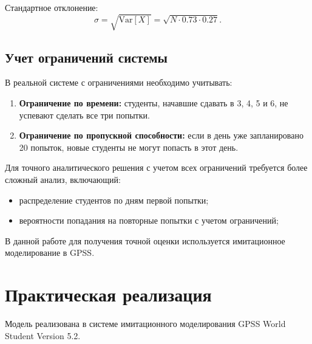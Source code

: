 \documentclass[a4paper, 14pt]{extarticle}
\begin{document}
Стандартное отклонение:
\[
\sigma = \sqrt{\text{Var}[X]} = \sqrt{N \cdot 0.73 \cdot 0.27}.
\]

\subsection{Учет ограничений системы}
В реальной системе с ограничениями необходимо учитывать:
\begin{enumerate}
  \item \textbf{Ограничение по времени:} студенты, начавшие сдавать в 3, 4, 5 и 6, не успевают сделать все три попытки.
  \item \textbf{Ограничение по пропускной способности:} если в день уже запланировано 20 попыток, новые студенты не могут попасть в этот день.
\end{enumerate}

Для точного аналитического решения с учетом всех ограничений требуется более сложный анализ, включающий:
\begin{itemize}
  \item распределение студентов по дням первой попытки;
  \item вероятности попадания на повторные попытки с учетом ограничений;
\end{itemize}

В данной работе для получения точной оценки используется имитационное моделирование в GPSS.

\section{Практическая реализация}
Модель реализована в системе имитационного моделирования GPSS World Student Version 5.2.
\end{document}
